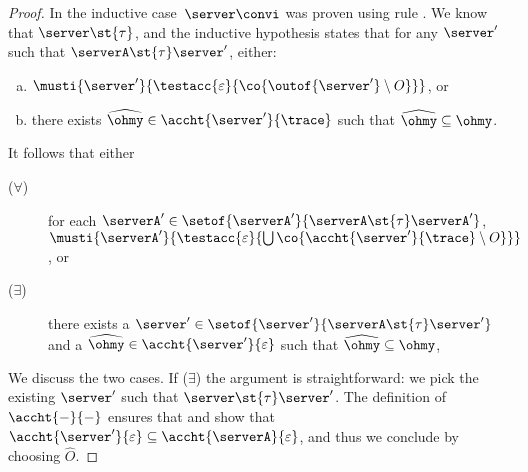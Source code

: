 {\begin{proof}
  In the inductive case~$\server \convi$ was proven using rule \mstep.
    We know that $ \server \st{ \tau }$,
    and the inductive hypothesis states that for any $\server'$ such that
    $\serverA \st{\tau} \server'$, either:
    \begin{enumerate}[(a)]
    \item\label{completeness-part-2.2-auxiliary-1-2-1-appendix}
      $\musti{\server'}{\testacc{\varepsilon}{\co{ \outof{\server'} \setminus O}}}$, or
    \item\label{completeness-part-2.2-auxiliary-1-2-2-appendix}
      there exists $\widehat{\ohmy} \in \accht{ \server' }{ \trace }$
      such that $\widehat{\ohmy} \subseteq \ohmy$.
    \end{enumerate}
    It follows that either
    \begin{description}
    \item[($\forall$)]
      \label{completeness-part-2.2-auxiliary-1-2-1}
      for each $\serverA' \in \setof{\serverA'}{\serverA \st{\tau} \serverA'}$,
      $\musti{\serverA'}{\testacc{\varepsilon}{\bigcup \co{\accht{ \server' }{ \trace } \setminus O}}}$, or
  \item[($\exists$)]
    \label{completeness-part-2.2-auxiliary-1-2-2}
    there exists a $\server' \in \setof{\server'}{\serverA \st{\tau} \server'}$
    and a $\widehat{\ohmy} \in \accht{ \server' }{ \varepsilon }$
    such that $\widehat{\ohmy} \subseteq \ohmy$,
    \end{description}
    \noindent
    We discuss the two cases. If ($\exists$) the argument is straightforward:
    we pick the existing $\server'$ such that $\server \st{\tau}
    \server'$. The definition of $\accht{-}{-}$ ensures that
    and show that $\accht{\server'}{\varepsilon} \subseteq
    \accht{\serverA}{\varepsilon}$, and thus we conclude by choosing $\widehat{O}$.


\end{proof}}
